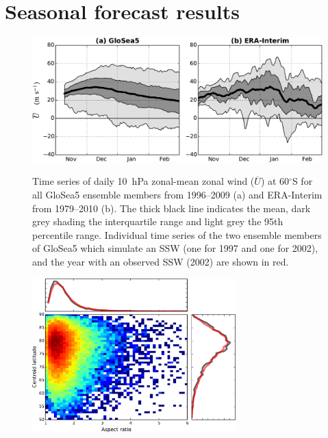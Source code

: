 \section{Seasonal forecast results}


\begin{figure}[t]
  \noindent\includegraphics[width=\textwidth,angle=0]{figures/chapter-seasonal/zmzw_climatologies_nh.pdf}\\
  \caption[Comparison of GloSea5 and ERA-Interim zonal-mean zonal wind
climatologies.]{Time series of daily 10~hPa zonal-mean zonal wind
($\overline{U}$) at 60$^{\circ}$S for all GloSea5 ensemble members from
1996--2009 (a) and ERA-Interim from 1979--2010 (b). The thick black line
indicates the mean, dark grey shading the interquartile range and light grey the
95th percentile range. Individual time series of the two ensemble members of
GloSea5 which simulate an SSW (one for 1997 and one for 2002), and the year with
an observed SSW (2002) are shown in red.}\label{fig:sh_zmzw_clim}
\end{figure}

\begin{figure}[t] \centering
  \noindent\includegraphics[width=0.7\textwidth,angle=0]{figures/chapter-seasonal/GloSea_moments_histogram.pdf}\\
  \caption[]{}\label{fig:sh_zmzw_clim}
\end{figure}


